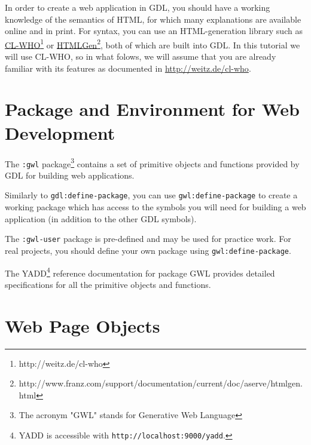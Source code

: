 \documentclass [11pt]{book}
\begin{document}
In order to create a web application in GDL, you should have a working
knowledge of the semantics of HTML, for which many explanations are available
online and in print.  For syntax, you can use an HTML-generation library such as \href{http://weitz.de/cl-who}{CL-WHO}\footnote{http://weitz.de/cl-who} or \href{http://www.franz.com/support/documentation/current/doc/aserve/htmlgen.html}{HTMLGen}\footnote{http://www.franz.com/support/documentation/current/doc/aserve/htmlgen.html}, both of which are built into GDL.  In this tutorial we will use CL-WHO, so in what folows,
we will assume that you are already familiar with its features as documented in \href{http://weitz.de/cl-who}{http://weitz.de/cl-who}.



\section{Package and Environment for Web Development}

\label{sec:packageandenvironmentforwebdevelopment}



The \texttt{:gwl} package\footnote{The acronym "GWL" stands
for Generative Web Language} contains a set of primitive objects and functions provided by
GDL for building web applications.



Similarly to \texttt{gdl:define-package}, you can use \texttt{gwl:define-package}
to create a working package which has access to the symbols you will need for building a
web application (in addition to the other GDL symbols).



The \texttt{:gwl-user} package is pre-defined and may be used for practice
work. For real projects, you should define your own package using \texttt{gwl:define-package}.



The YADD\footnote{YADD is accessible with \texttt{http://localhost:9000/yadd}.} reference documentation for package
GWL provides detailed specifications for all the primitive objects and functions.



\section{Web Page Objects}

\label{sec:webpageobjects}
\end{document}
